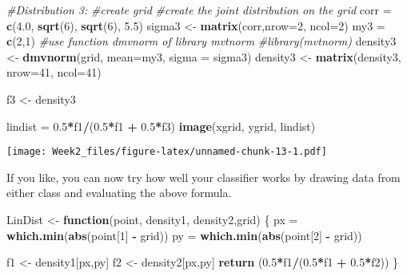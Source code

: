 \documentclass[]{article}
\newenvironment{Shaded}{\begin{snugshade}}{\end{snugshade}}
\newcommand{\CommentTok}[1]{\textcolor[rgb]{0.56,0.35,0.01}{\textit{#1}}}
\newcommand{\ControlFlowTok}[1]{\textcolor[rgb]{0.13,0.29,0.53}{\textbf{#1}}}
\newcommand{\DataTypeTok}[1]{\textcolor[rgb]{0.13,0.29,0.53}{#1}}
\newcommand{\DecValTok}[1]{\textcolor[rgb]{0.00,0.00,0.81}{#1}}
\newcommand{\FloatTok}[1]{\textcolor[rgb]{0.00,0.00,0.81}{#1}}
\newcommand{\KeywordTok}[1]{\textcolor[rgb]{0.13,0.29,0.53}{\textbf{#1}}}
\newcommand{\NormalTok}[1]{#1}
\newcommand{\OperatorTok}[1]{\textcolor[rgb]{0.81,0.36,0.00}{\textbf{#1}}}
\newcommand{\StringTok}[1]{\textcolor[rgb]{0.31,0.60,0.02}{#1}}
\begin{document}
\begin{Shaded}
\begin{Highlighting}[]
\CommentTok{#Distribution 3:}
\CommentTok{#create grid }
\CommentTok{#create the joint distribution on the grid}
\NormalTok{corr =}\StringTok{ }\KeywordTok{c}\NormalTok{(}\FloatTok{4.0}\NormalTok{, }\KeywordTok{sqrt}\NormalTok{(}\DecValTok{6}\NormalTok{), }\KeywordTok{sqrt}\NormalTok{(}\DecValTok{6}\NormalTok{), }\FloatTok{5.5}\NormalTok{)}
\NormalTok{sigma3 <-}\StringTok{ }\KeywordTok{matrix}\NormalTok{(corr,}\DataTypeTok{nrow=}\DecValTok{2}\NormalTok{, }\DataTypeTok{ncol=}\DecValTok{2}\NormalTok{)}
\NormalTok{my3 =}\StringTok{ }\KeywordTok{c}\NormalTok{(}\DecValTok{2}\NormalTok{,}\DecValTok{1}\NormalTok{)}
\CommentTok{#use function dmvnorm of library mvtnorm}
\CommentTok{#library(mvtnorm)}
\NormalTok{density3 <-}\StringTok{ }\KeywordTok{dmvnorm}\NormalTok{(grid, }\DataTypeTok{mean=}\NormalTok{my3, }\DataTypeTok{sigma =}\NormalTok{ sigma3)}
\NormalTok{density3 <-}\StringTok{ }\KeywordTok{matrix}\NormalTok{(density3, }\DataTypeTok{nrow=}\DecValTok{41}\NormalTok{, }\DataTypeTok{ncol=}\DecValTok{41}\NormalTok{)}

\NormalTok{f3 <-}\StringTok{ }\NormalTok{density3}

\NormalTok{lindist =}\StringTok{ }\FloatTok{0.5}\OperatorTok{*}\NormalTok{f1}\OperatorTok{/}\NormalTok{(}\FloatTok{0.5}\OperatorTok{*}\NormalTok{f1 }\OperatorTok{+}\StringTok{ }\FloatTok{0.5}\OperatorTok{*}\NormalTok{f3)}
\KeywordTok{image}\NormalTok{(xgrid, ygrid, lindist)}
\end{Highlighting}
\end{Shaded}

\texttt{[image: Week2\_files/figure-latex/unnamed-chunk-13-1.pdf]}

If you like, you can now try how well your classifier works by drawing
data from either class and evaluating the above formula.

\begin{Shaded}
\begin{Highlighting}[]
\NormalTok{LinDist <-}\StringTok{ }\ControlFlowTok{function}\NormalTok{(point, density1, density2,grid)}
\NormalTok{\{}
\NormalTok{  px =}\StringTok{ }\KeywordTok{which.min}\NormalTok{(}\KeywordTok{abs}\NormalTok{(point[}\DecValTok{1}\NormalTok{] }\OperatorTok{-}\StringTok{ }\NormalTok{grid)) }
\NormalTok{  py =}\StringTok{ }\KeywordTok{which.min}\NormalTok{(}\KeywordTok{abs}\NormalTok{(point[}\DecValTok{2}\NormalTok{] }\OperatorTok{-}\StringTok{ }\NormalTok{grid))}
    
\NormalTok{  f1 <-}\StringTok{ }\NormalTok{density1[px,py]}
\NormalTok{  f2 <-}\StringTok{ }\NormalTok{density2[px,py]}
  \KeywordTok{return}\NormalTok{ (}\FloatTok{0.5}\OperatorTok{*}\NormalTok{f1}\OperatorTok{/}\NormalTok{(}\FloatTok{0.5}\OperatorTok{*}\NormalTok{f1 }\OperatorTok{+}\StringTok{ }\FloatTok{0.5}\OperatorTok{*}\NormalTok{f2))}
\NormalTok{\}}
\end{Highlighting}
\end{Shaded}
\end{document}
